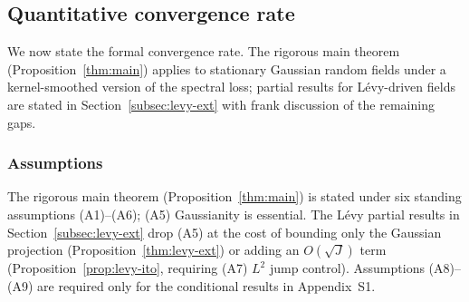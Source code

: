 \documentclass[review,12pt]{elsarticle}
\begin{document}
\subsection{Quantitative convergence rate}
\label{subsec:convergence}

We now state the formal convergence rate. The rigorous main theorem
(Proposition~\ref{thm:main}) applies to stationary Gaussian random fields
under a kernel-smoothed version of the spectral loss; partial results
for L\'evy-driven fields are stated in
Section~\ref{subsec:levy-ext} with frank discussion of the
remaining gaps.

\subsubsection{Assumptions}

The rigorous main theorem (Proposition~\ref{thm:main}) is stated under
six standing assumptions (A1)--(A6); (A5) Gaussianity is essential.
The L\'evy partial results in Section~\ref{subsec:levy-ext} drop
(A5) at the cost of bounding only the Gaussian projection
(Proposition~\ref{thm:levy-ext}) or adding an $O(\sqrt{J})$ term
(Proposition~\ref{prop:levy-ito}, requiring (A7) $L^2$ jump control).
Assumptions (A8)--(A9) are required only for the conditional
results in Appendix~S1.
\end{document}
